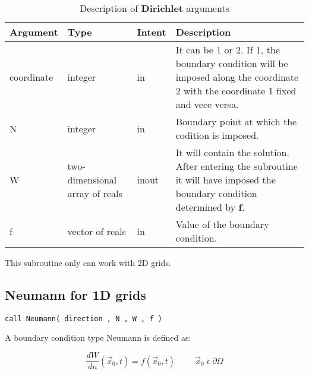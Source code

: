 \begin{table}[H]
	\begin{center}
		\begin{spacing}{1.2}
			\begin{tabular}{| l | l | l | p{6cm} |}
				
				\hline
				
				\bf Argument & \bf Type & \bf Intent & \bf Description \\ \hline \hline
				
				coordinate & integer & in &  It can be 1 or 2. If 1, the boundary condition will be imposed along the coordinate 2 with the coordinate 1 fixed and vece versa. \\ \hline
				
				N &  integer & in & Boundary point at which the codition is imposed.\\ \hline
				
				W &  two-dimensional array of reals & inout & It will contain the solution. After entering the subroutine it will have imposed the boundary condition determined by \textbf{f}. \\ \hline
				
				f &  vector of reals & in & Value of the boundary condition. \\ \hline
				
			\end{tabular}
		\end{spacing}
	\end{center}
	\caption{Description of \textbf{Dirichlet} arguments}
\end{table}

This subroutine only can work with 2D grids.

\subsection*{Neumann for 1D grids}

\lstset{language=Fortran}
\begin{lstlisting}[frame=trBL]
call Neumann( direction , N , W , f )\end{lstlisting}

A boundary condition type Neumann is defined as:

\begin{equation*}
\frac{dW}{dn}(\vec{x}_{0},t)= f(\vec{x}_{0},t)   \hspace{1cm}   \vec{x}_{0} \; \epsilon \; \partial \Omega
\end{equation*}

